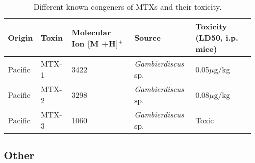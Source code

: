 \documentclass[12pt]{article}
\begin{document}
\begin{sidewaystable}[!htbp]
\caption{Different known congeners of MTXs and their toxicity.}
\begin{tabular}{ |  p{4cm} | p{4cm} | p{4cm} | p{4cm} | p{4cm} | }
\hline
\textbf{Origin} & \textbf{Toxin} & \textbf{Molecular Ion [M +H]$^{+}$} & \textbf{Source} & \textbf{Toxicity (LD50, i.p. mice)} \\
\hline
 Pacific & MTX-1 & 3422 \cite{holmes1994purification,murata1993structure} & \emph{Gambierdiscus} sp. \cite{holmes1994purification} & 0.05$\mu$g/kg \cite{murata1993structure}\\
\hline
 Pacific & MTX-2 & 3298 \cite{holmes1994purification} & \emph{Gambierdiscus} sp. \cite{holmes1994purification} & 0.08$\mu$g/kg \cite{holmes1994purification}\\
\hline
 Pacific & MTX-3 & 1060   \cite{holmes1994purification} & \emph{Gambierdiscus} sp. \cite{holmes1994purification} & Toxic \cite{holmes1994purification} \\
\hline
\end{tabular}
\end{sidewaystable}
\FloatBarrier

\subsection{Other}
\end{document}
